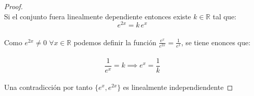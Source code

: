 \documentclass[11pt,letterpaper]{article}
\newcommand{\R}{\mathbb{R}}
\begin{document}
\begin{proof}\,\\
    Si el conjunto fuera linealmente dependiente entonces existe $k\in \R$ tal que:\,\\
    \begin{equation*}
        e^{2x}=k\,e^{x}
    \end{equation*}\,\\
    Como $e^{2x}\neq 0$ $\forall x\in \R$ podemos definir la funci\'on $\frac{e^x}{e^{2x}}=\frac{1}{e^x}$, se tiene enonces que:\,\\
    \,\\
    \begin{equation*}
        \frac{1}{e^x}=k\implies e^x=\frac{1}{k}
    \end{equation*}\,\\
    Una contradicci\'on por tanto $\{e^x,e^{2x}\}$ es linealmente independiendente
\end{proof}\,\\
\end{document}
